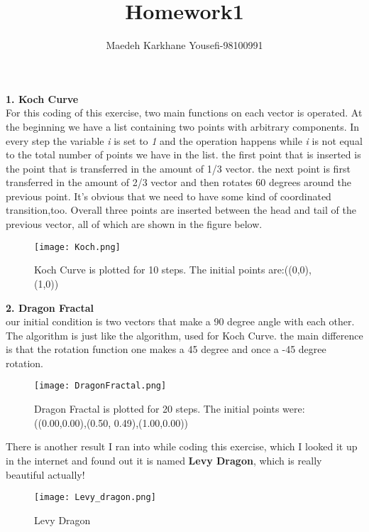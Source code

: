 \documentclass[12pt,a4paper]{article}
\title{\textbf{Homework1}}
\author{Maedeh Karkhane Yousefi-98100991}
\begin{document}
\maketitle
\textbf{1. Koch Curve}
\\For this coding of this exercise, two main functions on each vector is operated. At the beginning we have a list containing two points with arbitrary components. In every step the variable \textit{i} is set to \textit{1} and the operation happens while \textit{i} is not equal to the total number of points we have in the list. the first point that is inserted is the point that is transferred in the amount of 1/3 vector. the next point is first transferred in the amount of 2/3 vector and then rotates 60 degrees around the previous point. It's obvious that we need to have some kind of coordinated transition,too. 
 Overall three points are inserted between the head and tail of the previous vector, all of which are shown in the figure below.
\begin{figure}[hb]
	\centering
	\texttt{[image: Koch.png]}
	\caption{Koch Curve is plotted for 10 steps. The initial points are:((0,0), (1,0))}
	\label{fig:mesh1}
\end{figure}


\textbf{2. Dragon Fractal}
\\our initial condition is two vectors that make a 90 degree angle with each other. The algorithm is just like the algorithm, used for Koch Curve. the main difference is that the rotation function one makes a 45 degree and once a -45 degree rotation.
\begin{figure}[H]
	\centering
	\texttt{[image: DragonFractal.png]}
	\caption{Dragon Fractal is plotted for 20 steps. The initial points were: ((0.00,0.00),(0.50, 0.49),(1.00,0.00))}
	\label{fig:mesh2}
\end{figure}

There is another result I ran into while coding this exercise, which I looked it up in the internet and found out it is named \textbf{Levy Dragon}, which is really beautiful actually!
\begin{figure}[H]
	\centering
	\texttt{[image: Levy\_dragon.png]}
	\caption{Levy Dragon}
	\label{fig:mesh3}
\end{figure}
\end{document}

